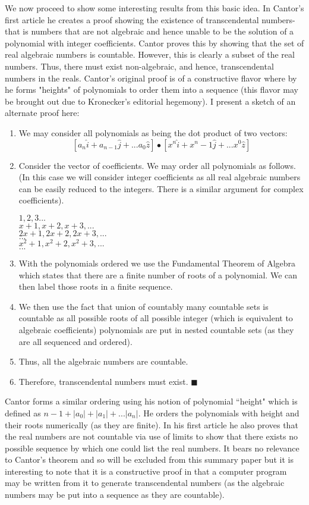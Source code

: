 \documentclass{article}
\begin{document}
\par We now proceed to show some interesting results from this basic idea. In Cantor's first article he creates a proof showing the existence of transcendental numbers- that is numbers that are not algebraic and hence unable to be the solution of a polynomial with integer coefficients. Cantor proves this by showing that the set of real algebraic numbers is countable. However, this is clearly a subset of the real numbers. Thus, there must exist non-algebraic, and hence, transcendental numbers in the reals. Cantor's original proof is of a constructive flavor where by he forms "heights" of polynomials to order them into a sequence (this flavor may be brought out due to Kronecker's editorial hegemony). I present a sketch of an alternate proof here:
\begin{enumerate}
\item We may consider all polynomials as being the dot product of two vectors:
\[
[a_n\hat{i}+a_{n-1}\hat{j}+...a_0\hat{z}]\bullet[x^n\hat{i}+x^n-1\hat{j}+...x^0\hat{z}]
\]
\item Consider the vector of coefficients. We may order all polynomials as follows. (In this case we will consider integer coefficients as all real algebraic numbers can be easily reduced to the integers. There is a similar argument for complex coefficients). 
\begin{center}
$1, 2 ,3 ...$\\
$x+1, x+2,x+3,...$\\
$2x+1, 2x+2, 2x+3,...$\\
$...$\\
$x^2+1, x^2+2, x^2+3,...$\\
$...$\\
\end{center}
\item With the polynomials ordered we use the Fundamental Theorem of Algebra which states that there are a finite number of roots of a polynomial. We can then label those roots in a finite sequence.
\item We then use the fact that union of countably many countable sets is countable as all possible roots of all possible integer (which is equivalent to algebraic coefficients) polynomials are put in nested countable sets (as they are all sequenced and ordered). 
\item Thus, all the algebraic numbers are countable.
\item Therefore, transcendental numbers must exist. $\blacksquare$
\end{enumerate}
\par Cantor forms a similar ordering using his notion of polynomial ``height" which is defined as $n-1+|a_0|+|a_1|+...|a_n|$. He orders the polynomials with height and their roots numerically (as they are finite). In his first article he also proves that the real numbers are not countable via use of limits to show that there exists no possible sequence by which one could list the real numbers. It bears no relevance to Cantor's theorem and so will be excluded from this summary paper but it is interesting to note that it is a constructive proof in that a computer program may be written from it to generate transcendental numbers (as the algebraic numbers may be put into a sequence as they are countable). 
\end{document}
